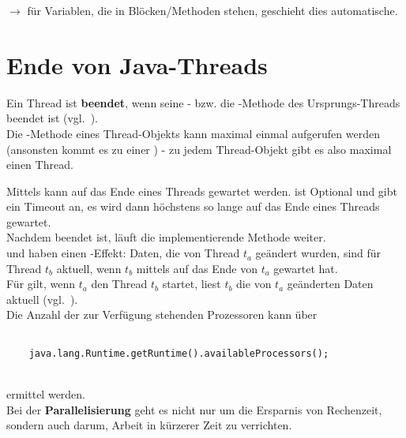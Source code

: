 $\rightarrow$ für Variablen, die in  Blöcken/Methoden stehen, geschieht dies automatische.

\section{Ende von Java-Threads}

Ein Thread ist \textbf{beendet}, wenn seine - bzw. die -Methode des Ursprungs-Threads beendet ist (vgl.~\cite[33]{Oec22}).\\

Die -Methode eines Thread-Objekts kann maximal einmal aufgerufen werden (ansonsten kommt es zu einer ) - zu jedem Thread-Objekt gibt es also maximal einen Thread.

Mittels  kann auf das Ende eines Threads gewartet werden.
 ist Optional und gibt ein Timeout an, es wird dann höchstens so lange auf das Ende eines Threads gewartet.\\
Nachdem  beendet ist, läuft die implementierende Methode weiter.\\

 und  haben einen -Effekt: Daten, die von Thread $t_a$ geändert wurden, sind für Thread $t_b$ aktuell, wenn $t_b$ mittels  auf das Ende von $t_a$ gewartet hat.\\
Für  gilt, wenn $t_a$ den Thread $t_b$ startet, liest $t_b$ die von $t_a$ geänderten Daten aktuell (vgl.~\cite[37]{Oec22}).\\

Die Anzahl der zur Verfügung stehenden Prozessoren kann über

\begin{verbatim}

    java.lang.Runtime.getRuntime().availableProcessors();
\end{verbatim}\\

ermittel werden.\\

Bei der \textbf{Parallelisierung} geht es nicht nur um die Ersparnis von Rechenzeit, sondern auch darum, Arbeit in kürzerer Zeit zu verrichten.